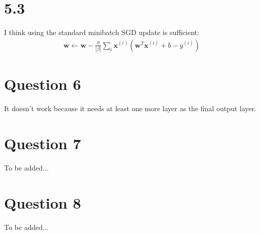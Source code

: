 \documentclass{article}
\newcommand{\abs}[1]{| #1 |}
\DeclareMathOperator*{\1}{\mathbbm{1}}
\newcommand{\w}{\textbf{w}}
\newcommand{\x}{\textbf{x}}
\theoremstyle{definition}
\theoremstyle{remark}
\begin{document}
\section*{5.3}
I think using the standard minibatch SGD update is sufficient:
\begin{align*}
 \w \leftarrow \w - \frac{\eta}{\abs{\beta}} \sum_i \x^{(i)}(\w^T\x^{(i)} + b - y^{(i)})  
\end{align*}
\section*{Question 6}
It doesn't work because it needs at least one more layer as the final output layer.
\section*{Question 7}
To be added...
\section*{Question 8}
To be added...
\end{document}
